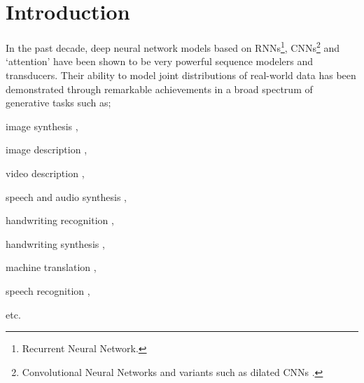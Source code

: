 \documentclass{article}
\begin{document}
\section{Introduction}
\label{intro}
In the past decade, deep neural network models based on RNNs\footnote{Recurrent Neural Network.}, CNNs\footnote{Convolutional Neural Networks and variants such as dilated CNNs \cite{Yu2015MultiScaleCA}.} and `attention' \cite{Vaswani2017AttentionIA} have been shown to be very powerful sequence modelers and transducers. Their ability to model joint distributions of real-world data has been demonstrated through remarkable achievements in a broad spectrum of generative tasks such as;
\begin{itemize*}
	\item[{image synthesis}] \cite{Oord2016PixelRN, Oord2016ConditionalIG, Salimans2017PixelCNNIT, Theis2015GenerativeIM}, 
	\item[{image description}] \cite{Karpathy2015DeepVA, Xu2015ShowAA, Johnson2016DenseCapFC, DBLP:journals/corr/PedersoliLSV16, Vinyals2015ShowAT}, 
	\item[{video description}] \cite{Donahue2015LongtermRC}, 
	\item[{speech and audio synthesis}] \cite{Oord2016WaveNetAG}, 
	\item[{handwriting recognition}] \cite{Graves2008OfflineHR, Bluche2016JointLS}, 
	\item[{handwriting synthesis}] \cite{Graves2013GeneratingSW}, 
	\item[{machine translation}] \cite{Cho2014LearningPR, Bahdanau2014NeuralMT, Kalchbrenner2016NeuralMT, Sutskever2014SequenceTS}, 
	\item[{speech recognition}] \cite{Graves2006ConnectionistTC, DBLP:journals/corr/ChanJLV15, DBLP:journals/corr/abs-1303-5778},
	\item[{etc.}] \cite{Graves2008SupervisedSL, Vaswani2017AttentionIA}
\end{itemize*}
\end{document}
